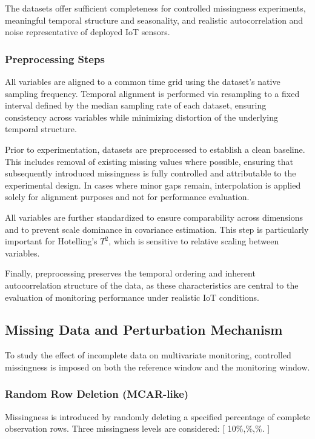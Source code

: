 The datasets offer sufficient completeness for controlled missingness experiments, meaningful temporal structure and seasonality, and realistic autocorrelation and noise representative of deployed \ac{IoT} sensors.

\subsubsection{Preprocessing Steps}

All variables are aligned to a common time grid using the dataset’s native sampling frequency. Temporal alignment is performed via resampling to a fixed interval defined by the median sampling rate of each dataset, ensuring consistency across variables while minimizing distortion of the underlying temporal structure.

Prior to experimentation, datasets are preprocessed to establish a clean baseline. This includes removal of existing missing values where possible, ensuring that subsequently introduced missingness is fully controlled and attributable to the experimental design. In cases where minor gaps remain, interpolation is applied solely for alignment purposes and not for performance evaluation.

All variables are further standardized to ensure comparability across dimensions and to prevent scale dominance in covariance estimation. This step is particularly important for Hotelling’s $T^2$, which is sensitive to relative scaling between variables.

Finally, preprocessing preserves the temporal ordering and inherent autocorrelation structure of the data, as these characteristics are central to the evaluation of monitoring performance under realistic IoT conditions.

\subsection{Missing Data and Perturbation Mechanism}

To study the effect of incomplete data on multivariate monitoring, controlled missingness is imposed on both the reference window and the monitoring window.

\subsubsection{Random Row Deletion (\ac{MCAR}-like)}

Missingness is introduced by randomly deleting a specified percentage of complete observation rows. Three missingness levels are considered:
[
10\%,\%,\%.
]

